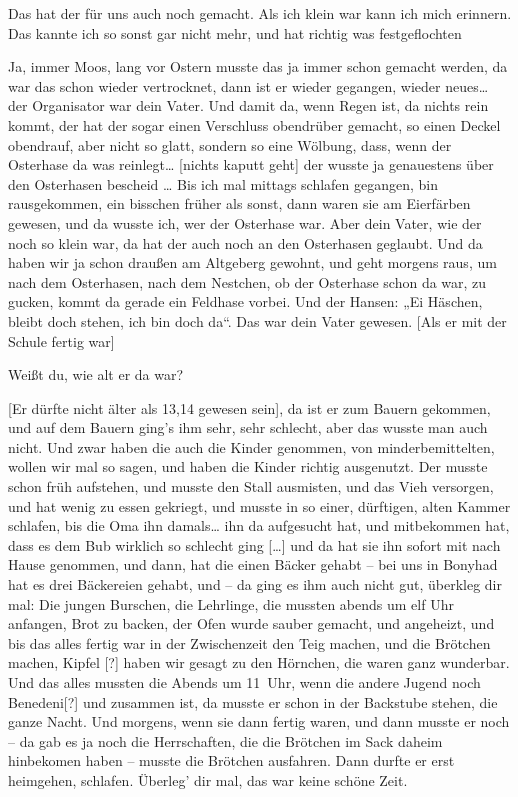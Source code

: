 \documentclass[ngerman,]{article}
\providecommand{\tightlist}{%
  \setlength{\itemsep}{0pt}\setlength{\parskip}{0pt}}
\begin{document}
\begin{multicols}{3}
\begin{description}
\tightlist
\item[Ruth]
Das hat der für uns auch noch gemacht. Als ich klein war kann ich mich
erinnern. Das kannte ich so sonst gar nicht mehr, und hat richtig was
festgeflochten
\item[Käthe]
Ja, immer Moos, lang vor Ostern musste das ja immer schon gemacht
werden, da war das schon wieder vertrocknet, dann ist er wieder
gegangen, wieder neues\ldots{} der Organisator war dein Vater. Und damit
da, wenn Regen ist, da nichts rein kommt, der hat der sogar einen
Verschluss obendrüber gemacht, so einen Deckel obendrauf, aber nicht so
glatt, sondern so eine Wölbung, dass, wenn der Osterhase da was
reinlegt\ldots{} {[}nichts kaputt geht{]} der wusste ja genauestens über
den Osterhasen bescheid \ldots{} Bis ich mal mittags schlafen gegangen,
bin rausgekommen, ein bisschen früher als sonst, dann waren sie am
Eierfärben gewesen, und da wusste ich, wer der Osterhase war. Aber dein
Vater, wie der noch so klein war, da hat der auch noch an den Osterhasen
geglaubt. Und da haben wir ja schon draußen am Altgeberg gewohnt, und
geht morgens raus, um nach dem Osterhasen, nach dem Nestchen, ob der
Osterhase schon da war, zu gucken, kommt da gerade ein Feldhase vorbei.
Und der Hansen: „Ei Häschen, bleibt doch stehen, ich bin doch da“. Das
war dein Vater gewesen. {[}Als er mit der Schule fertig war{]}
\item[Ruth]
Weißt du, wie alt er da war?
\item[Käthe]
{[}Er dürfte nicht älter als 13,14 gewesen sein{]}, da ist er zum Bauern
gekommen, und auf dem Bauern ging's ihm sehr, sehr schlecht, aber das
wusste man auch nicht. Und zwar haben die auch die Kinder genommen, von
minderbemittelten, wollen wir mal so sagen, und haben die Kinder richtig
ausgenutzt. Der musste schon früh aufstehen, und musste den Stall
ausmisten, und das Vieh versorgen, und hat wenig zu essen gekriegt, und
musste in so einer, dürftigen, alten Kammer schlafen, bis die Oma ihn
damals\ldots{} ihn da aufgesucht hat, und mitbekommen hat, dass es dem
Bub wirklich so schlecht ging {[}\ldots{}{]} und da hat sie ihn sofort
mit nach Hause genommen, und dann, hat die einen Bäcker gehabt – bei uns
in Bonyhad hat es drei Bäckereien gehabt, und – da ging es ihm auch
nicht gut, überkleg dir mal: Die jungen Burschen, die Lehrlinge, die
mussten abends um elf Uhr anfangen, Brot zu backen, der Ofen wurde
sauber gemacht, und angeheizt, und bis das alles fertig war in der
Zwischenzeit den Teig machen, und die Brötchen machen, Kipfel {[}?{]}
haben wir gesagt zu den Hörnchen, die waren ganz wunderbar. Und das
alles mussten die Abends um 11~Uhr, wenn die andere Jugend noch
Benedeni{[}?{]} und zusammen ist, da musste er schon in der Backstube
stehen, die ganze Nacht. Und morgens, wenn sie dann fertig waren, und
dann musste er noch – da gab es ja noch die Herrschaften, die die
Brötchen im Sack daheim hinbekomen haben – musste die Brötchen
ausfahren. Dann durfte er erst heimgehen, schlafen. Überleg' dir mal,
das war keine schöne Zeit.
\end{description}


\end{multicols}
\end{document}
